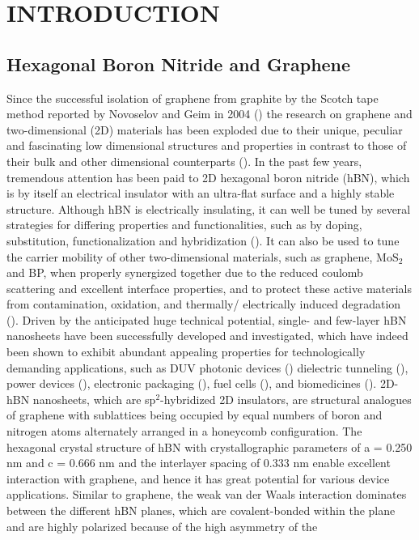 \newpage {}
\section{INTRODUCTION}



\subsection{Hexagonal Boron Nitride and Graphene}


Since the successful isolation of graphene from graphite by the Scotch tape method reported by Novoselov and Geim in 2004 (\cite{novoselov2004electric}) the research on graphene and two-dimensional (2D) materials has been exploded due to their unique, peculiar and fascinating low dimensional structures and properties in contrast to those of their bulk and other dimensional counterparts (\cite{xu2013graphene}). In the past few years, tremendous attention has been paid to 2D hexagonal boron nitride (hBN), which is by itself an electrical insulator with an ultra-flat surface and a highly stable structure. Although hBN is electrically insulating, it can well be tuned by several strategies for differing properties and functionalities, such as by doping, substitution, functionalization and hybridization (\cite{zhang2017two}). It can also be used to tune the carrier mobility of other two-dimensional materials, such as graphene, $ \text{MoS}_{2} $ and BP, when properly synergized together due to the reduced coulomb scattering and excellent interface properties, and to protect these active materials from contamination, oxidation, and thermally/ electrically induced degradation (\cite{zhang2017two}). Driven by the anticipated huge technical potential, single- and few-layer hBN nanosheets have been successfully developed and investigated, which have indeed been shown to exhibit abundant appealing properties for technologically demanding applications, such as DUV photonic devices (\cite{jiang2014hexagonal}) dielectric tunneling (\cite{hui2016use}), power devices (\cite{constantinescu2016multipurpose}), electronic packaging (\cite{bao2016two}), fuel cells (\cite{oh2014enhanced}), and biomedicines (\cite{chimene2015two}). 2D-hBN nanosheets, which are s$\text{p}^{2}$-hybridized 2D insulators, are structural analogues of graphene with sublattices being occupied by equal numbers of boron and nitrogen atoms alternately arranged in a honeycomb configuration. The hexagonal crystal structure of hBN with crystallographic parameters of a = 0.250 nm and c = 0.666 nm and the interlayer spacing of 0.333 nm enable excellent interaction with graphene, and hence it has great potential for various device applications. Similar to graphene, the weak van der Waals interaction dominates between the different hBN planes, which are covalent-bonded within the plane and are highly polarized because of the high asymmetry of the 